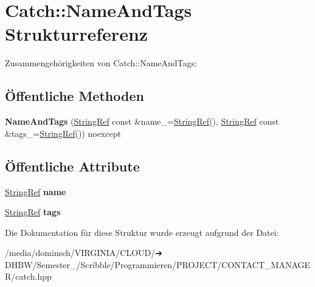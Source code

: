 \hypertarget{structCatch_1_1NameAndTags}{}\section{Catch\+:\+:Name\+And\+Tags Strukturreferenz}
\label{structCatch_1_1NameAndTags}


Zusammengehörigkeiten von Catch\+:\+:Name\+And\+Tags\+:
\subsection*{Öffentliche Methoden}
\begin{DoxyCompactItemize}
\item 
\mbox{\label{structCatch_1_1NameAndTags_ab585111e615ce8c504a2b9630de8ee94}} 
{\bfseries Name\+And\+Tags} (\hyperlink{classCatch_1_1StringRef}{String\+Ref} const \&name\+\_\+=\hyperlink{classCatch_1_1StringRef}{String\+Ref}(), \hyperlink{classCatch_1_1StringRef}{String\+Ref} const \&tags\+\_\+=\hyperlink{classCatch_1_1StringRef}{String\+Ref}()) noexcept
\end{DoxyCompactItemize}
\subsection*{Öffentliche Attribute}
\begin{DoxyCompactItemize}
\item 
\mbox{\label{structCatch_1_1NameAndTags_a7cbea60e0cebfa622c667008eb011420}} 
\hyperlink{classCatch_1_1StringRef}{String\+Ref} {\bfseries name}
\item 
\mbox{\label{structCatch_1_1NameAndTags_a74062ed1138834a348424eb7ed900c57}} 
\hyperlink{classCatch_1_1StringRef}{String\+Ref} {\bfseries tags}
\end{DoxyCompactItemize}


Die Dokumentation für diese Struktur wurde erzeugt aufgrund der Datei\+:\begin{DoxyCompactItemize}
\item 
/media/dominsch/\+V\+I\+R\+G\+I\+N\+I\+A/\+C\+L\+O\+U\+D/➔ D\+H\+B\+W/\+Semester\+\_/\+Scribble/\+Programmieren/\+P\+R\+O\+J\+E\+C\+T/\+C\+O\+N\+T\+A\+C\+T\+\_\+\+M\+A\+N\+A\+G\+E\+R/catch.\+hpp\end{DoxyCompactItemize}

